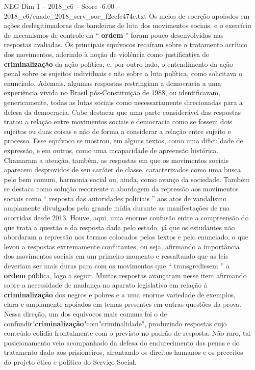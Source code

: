 \begin{textsample}{NEG Dim 1 – 2018\_c6 – Score -6.00 – 2018\_c6/enade\_2018\_serv\_soc\_f2ecfc474e.txt}
Os meios de coerção apoiados em ações deslegitimadoras das bandeiras de luta dos movimentos sociais, e o exercício de mecanismos de controle da “ \textbf{ordem} ” foram pouco desenvolvidos nas respostas avaliadas.
Os principais equívocos recaíram sobre o tratamento acrítico dos movimentos, aderindo à noção de violência como justificativa de \textbf{criminalização} da ação política, e, por outro lado, o entendimento da ação penal sobre os sujeitos individuais e não sobre a luta política, como solicitava o enunciado.
Ademais, algumas respostas restringiam a democracia a uma experiência vivida no Brasil pós-Constituição de 1988, ou identificavam, genericamente, todas as lutas sociais como necessariamente direcionadas para a defesa da democracia.
Cabe destacar que uma parte considerável das respostas tratou a relação entre movimentos sociais e democracia como se fossem dois sujeitos ou duas coisas e não de forma a considerar a relação entre sujeito e processo.
Esse equívoco se mostrou, em alguns textos, como uma dificuldade de expressão, e em outros, como uma incapacidade de apreensão histórica.
Chamaram a atenção, também, as respostas em que os movimentos sociais aparecem desprovidos de seu caráter de classe, caracterizados como uma busca pelo bem comum, harmonia social ou, ainda, como avanço da sociedade.
Também se destaca como solução recorrente a abordagem da repressão aos movimentos sociais como “ resposta das autoridades policiais ” aos atos de vandalismo amplamente divulgados pela grande mídia durante as manifestações de rua ocorridas desde 2013.
Houve, aqui, uma enorme confusão entre a compreensão do que trata a questão e da resposta dada pelo estado, já que os estudantes não abordaram a repressão nos termos colocados pelos textos e pelo enunciado, o que levou a respostas extremamente conflitantes, ou seja, afirmando a importância dos movimentos sociais em um primeiro momento e ressaltando que as leis deveriam ser mais duras para com os movimentos que “ transgredissem ” a \textbf{ordem} pública, logo a seguir.
Muitas respostas avançaram nesse item afirmando sobre a necessidade de mudança no aparato legislativo em relação à \textbf{criminalização} dos negros e pobres e a uma enorme variedade de exemplos, clara e amplamente apoiados em temas presentes em outras questões da prova.
Nessa direção, um dos equívocos mais comuns foi o de confundir"\textbf{criminalização}"com"criminalidade", produzindo respostas cujo conteúdo colidia frontalmente com o previsto no padrão de resposta.
Não raro, tal posicionamento veio acompanhado da defesa do endurecimento das penas e do tratamento dado aos prisioneiros, afrontando os direitos humanos e os preceitos do projeto ético e político do Serviço Social.

\end{textsample}
